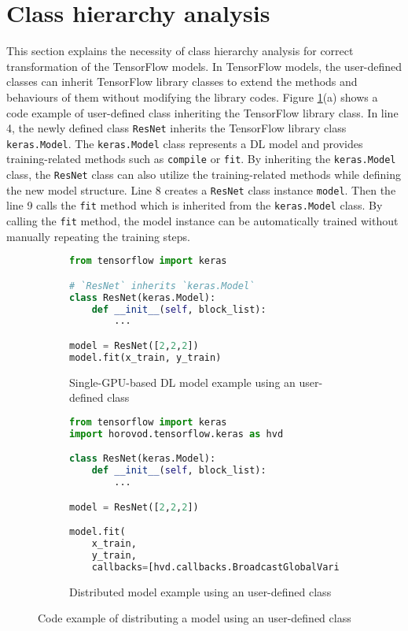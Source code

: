 \section{Class hierarchy analysis}\label{sec:cha}

This section explains the necessity of class hierarchy analysis for correct
transformation of the TensorFlow models.
In TensorFlow models, the user-defined classes can inherit 
TensorFlow library classes to extend the methods and behaviours of them 
without modifying the library codes. 
Figure \ref{fig:cha:tfex}(a) shows a code example of user-defined class
inheriting the TensorFlow library class.
In line 4, the newly defined class {\tt ResNet} inherits the TensorFlow
library class {\tt keras.Model}.
The {\tt keras.Model} class represents a DL model
and provides training-related methods such as {\tt compile} or {\tt fit}.
By inheriting the {\tt keras.Model} class, the {\tt ResNet} class
can also utilize the training-related methods while defining the new model
structure.
Line 8 creates a {\tt ResNet} class instance {\tt model}.
Then the line 9 calls the {\tt fit} method which is inherited from the
{\tt keras.Model} class.
By calling the {\tt fit} method, the model instance can be automatically
trained without manually repeating the training steps.

\begin{figure}[!ht]
  \centering
  \begin{subfigure}[t]{0.35\textwidth}
    \begin{lstlisting}[language=Python]
from tensorflow import keras

# `ResNet` inherits `keras.Model`
class ResNet(keras.Model): 
    def __init__(self, block_list):
        ...

model = ResNet([2,2,2])
model.fit(x_train, y_train)\end{lstlisting}
    \caption{Single-GPU-based DL model example using an user-defined class}
  \end{subfigure}
  \hspace{3mm}
  \begin{subfigure}[t]{0.6\textwidth}
    \begin{lstlisting}[language=Python]
from tensorflow import keras
import horovod.tensorflow.keras as hvd

class ResNet(keras.Model):
    def __init__(self, block_list):
        ...

model = ResNet([2,2,2])

model.fit(
    x_train, 
    y_train,
    callbacks=[hvd.callbacks.BroadcastGlobalVariablesCallback(0)])\end{lstlisting}
    \caption{Distributed model example using an user-defined class}
  \end{subfigure}

  \caption{Code example of distributing a model using an user-defined class}
  \label{fig:cha:tfex}
\end{figure}


